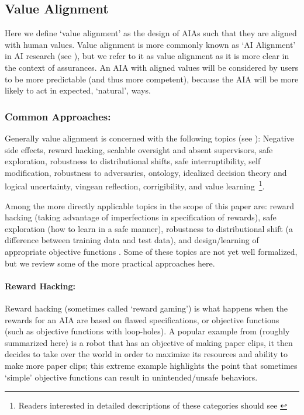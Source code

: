 \subsection{Value Alignment} \label{sec:value_alignment}
Here we define `value alignment' as the design of AIAs such that they are aligned with human values\citet{Gordon_Worley2018-xy}. Value alignment is more commonly known as `AI Alignment' in AI research (see \cite{Yudkowsky2001-hb,Bensinger2014-ul}), but we refer to it as value alignment as it is more clear in the context of assurances. An AIA with aligned values will be considered by users to be more predictable (and thus more competent), because the AIA will be more likely to act in expected, `natural', ways.

\subsubsection{Common Approaches:}
Generally value alignment is concerned with the following topics (see \cite{Gordon_Worley2018-xy,Amodei2016-xi}): Negative side effects, reward hacking, scalable oversight and absent supervisors, safe exploration, robustness to distributional shifts, safe interruptibility, self modification, robustness to adversaries, ontology, idealized decision theory and logical uncertainty, vingean reflection, corrigibility, and value learning~\footnote{Readers interested in detailed descriptions of these categories should see \cite{Gordon_Worley2018-xy,Amodei2016-xi}}.

Among the more directly applicable topics in the scope of this paper are: reward hacking (taking advantage of imperfections in specification of rewards), safe exploration (how to learn in a safe manner), robustness to distributional shift (a difference between training data and test data), and design/learning of appropriate objective functions \cite{Hadfield-Menell2016-ws,Da_Veiga2012-gh,Garcia2015-rs}. Some of these topics are not yet well formalized, but we review some of the more practical approaches here.

\paragraph{Reward Hacking:}
Reward hacking (sometimes called `reward gaming') is what happens when the rewards for an AIA are based on flawed specifications, or objective functions (such as objective functions with loop-holes). A popular example from \citet{Bostrom2014-fz} (roughly summarized here) is a robot that has an objective of making paper clips, it then decides to take over the world in order to maximize its resources and ability to make more paper clips; this extreme example highlights the point that sometimes `simple' objective functions can result in unintended/unsafe behaviors.

